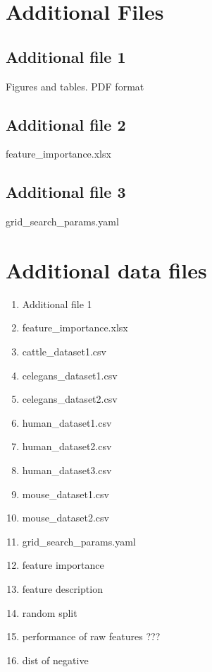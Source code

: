 \documentclass{bmcart}
\begin{document}
\begin{backmatter}
\section*{Additional Files}
  \subsection*{Additional file 1} \label{add:figs_tbls}
    Figures and tables. PDF format

  \subsection*{Additional file 2}  \label{add:feature importance}
    feature\_importance.xlsx
 
 \subsection*{Additional file 3}  \label{add:hyperoptparams}
   grid\_search\_params.yaml




\section*{Additional data files}




\begin{enumerate}
\item Additional file 1
\item feature_importance.xlsx
\item cattle\_dataset1.csv
\item celegans\_dataset1.csv
\item celegans\_dataset2.csv
\item human\_dataset1.csv
\item human\_dataset2.csv
\item human\_dataset3.csv
\item mouse\_dataset1.csv
\item mouse\_dataset2.csv
\item grid\_search\_params.yaml
\item feature importance 
\item feature description
\item random split
\item performance of raw features ???
\item dist of negative


\end{enumerate}




\end{backmatter}
\end{document}
